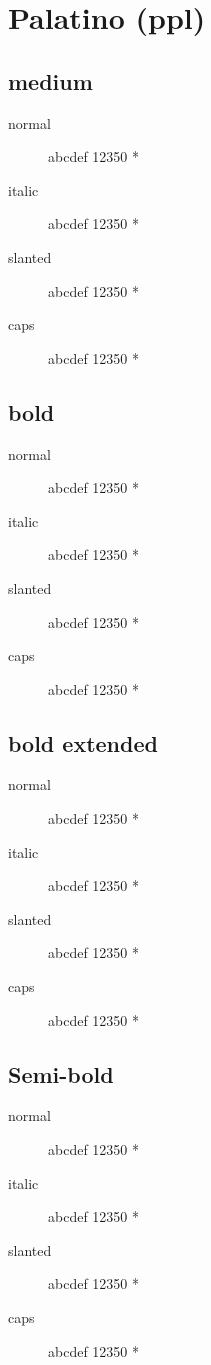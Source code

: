 \section{Palatino (ppl)}

\subsection{medium}
\begin{description}
    \item [normal]  abcdef 12350 *
    \item [italic]  abcdef 12350 *
    \item [slanted]  abcdef 12350 *
    \item [caps]  abcdef 12350 *
\end{description}
    
\subsection{bold}
\begin{description}
    \item [normal]  abcdef 12350 *
    \item [italic]  abcdef 12350 *
    \item [slanted]  abcdef 12350 *
    \item [caps]  abcdef 12350 *
\end{description}
    
\subsection{bold extended}
\begin{description}
    \item [normal]  abcdef 12350 *
    \item [italic]  abcdef 12350 *
    \item [slanted]  abcdef 12350 *
    \item [caps]  abcdef 12350 *
\end{description}

\subsection{Semi-bold}
\begin{description}
    \item [normal]  abcdef 12350 *
    \item [italic]  abcdef 12350 *
    \item [slanted]  abcdef 12350 *
    \item [caps]  abcdef 12350 *
\end{description}

